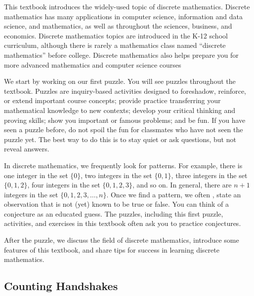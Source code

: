 

This textbook introduces the widely-used topic of discrete mathematics. Discrete mathematics has many applications in computer science, information and data science, and mathematics, as well as throughout the sciences, business, and economics.  Discrete mathematics topics are introduced in the K-12 school curriculum, although there is rarely a mathematics class named ``discrete mathematics'' before college.  Discrete mathematics also helps prepare you for more advanced mathematics and computer science courses

We start by working on our first puzzle.  You will see puzzles throughout the textbook. Puzzles are inquiry-based activities designed to foreshadow, reinforce, or extend important course concepts; provide practice transferring your mathematical knowledge to new contexts; develop your critical thinking and proving skills; show you important or famous problems; and be fun. If you have seen a puzzle before, do not spoil the fun for classmates who have not seen the puzzle yet. The best way to do this is to stay quiet or ask questions, but not reveal answers.

In discrete mathematics, we frequently look for patterns. For example, there is one integer in the set $\{0\}$, two integers in the set $\{0,1\}$, three integers in the set $\{0,1,2\}$, four integers in the set $\{0,1,2,3\}$, and so on.
In general, there are $n+1$ integers in the set $\{0,1,2,3, \ldots, n\}$.  Once we find a pattern, we often , state an observation that is not (yet) known to be true or false.  You can think of a conjecture as an educated guess. The puzzles, including this first puzzle, activities, and exercises in this textbook often ask you to practice conjectures.

After the puzzle, we discuss the field of discrete mathematics, introduce some features of this textbook, and share tips for success in learning discrete mathematics.


\newcommand{\subhs}{Counting Handshakes}
\subsection{\subhs}
\label{sub_handshakes}

